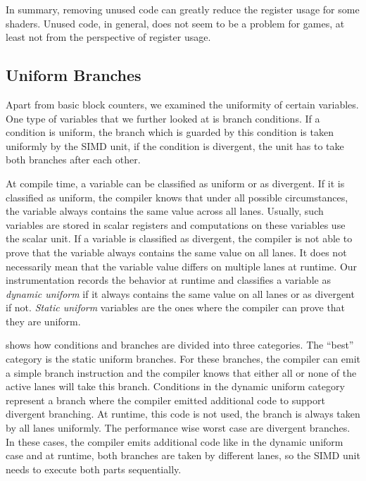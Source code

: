 In summary, removing unused code can greatly reduce the register usage for some shaders.
Unused code, in general, does not seem to be a problem for games, at least not from the perspective of register usage.

\subsection{Uniform Branches}
\label{sub:eval_uniform_branches}
Apart from basic block counters, we examined the uniformity of certain variables.
One type of variables that we further looked at is branch conditions.
If a condition is uniform, the branch which is guarded by this condition is taken uniformly by the SIMD unit, if the condition is divergent, the unit has to take both branches after each other.

At compile time, a variable can be classified as uniform or as divergent.
If it is classified as uniform, the compiler knows that under all possible circumstances, the variable always contains the same value across all lanes.
Usually, such variables are stored in scalar registers and computations on these variables use the scalar unit.
If a variable is classified as divergent, the compiler is not able to prove that the variable always contains the same value on all lanes.
It does not necessarily mean that the variable value differs on multiple lanes at runtime.
Our instrumentation records the behavior at runtime and classifies a variable as \emph{dynamic uniform} if it always contains the same value on all lanes or as divergent if not.
\emph{Static uniform} variables are the ones where the compiler can prove that they are uniform.



 shows how conditions and branches are divided into three categories.
The \enquote{best} category is the static uniform branches.
For these branches, the compiler can emit a simple branch instruction and the compiler knows that either all or none of the active lanes will take this branch.
Conditions in the dynamic uniform category represent a branch where the compiler emitted additional code to support divergent branching.
At runtime, this code is not used, the branch is always taken by all lanes uniformly.
The performance wise worst case are divergent branches.
In these cases, the compiler emits additional code like in the dynamic uniform case and at runtime, both branches are taken by different lanes, so the SIMD unit needs to execute both parts sequentially.

